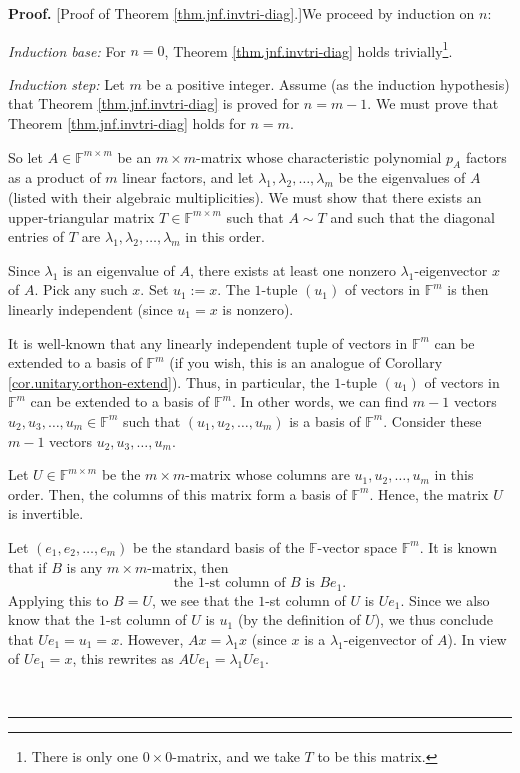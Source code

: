 \documentclass[numbers=enddot,12pt,final,onecolumn,notitlepage]{scrartcl}%
\numberwithin{exer}{subsection}
\theoremstyle{definition}
\newenvironment{proof}[1][Proof]{\noindent\textbf{#1.} }{\ \rule{0.5em}{0.5em}}
\begin{document}
\begin{proof}
[Proof of Theorem \ref{thm.jnf.invtri-diag}.]We proceed by induction on $n$:

\textit{Induction base:} For $n=0$, Theorem \ref{thm.jnf.invtri-diag} holds
trivially\footnote{There is only one $0\times0$-matrix, and we take $T$ to be
this matrix.}.

\textit{Induction step:} Let $m$ be a positive integer. Assume (as the
induction hypothesis) that Theorem \ref{thm.jnf.invtri-diag} is proved for
$n=m-1$. We must prove that Theorem \ref{thm.jnf.invtri-diag} holds for $n=m$.

So let $A\in\mathbb{F}^{m\times m}$ be an $m\times m$-matrix whose
characteristic polynomial $p_{A}$ factors as a product of $m$ linear factors,
and let $\lambda_{1},\lambda_{2},\ldots,\lambda_{m}$ be the eigenvalues of $A$
(listed with their algebraic multiplicities). We must show that there exists
an upper-triangular matrix $T\in\mathbb{F}^{m\times m}$ such that $A\sim T$
and such that the diagonal entries of $T$ are $\lambda_{1},\lambda_{2}%
,\ldots,\lambda_{m}$ in this order.

Since $\lambda_{1}$ is an eigenvalue of $A$, there exists at least one nonzero
$\lambda_{1}$-eigenvector $x$ of $A$. Pick any such $x$. Set $u_{1}:=x$. The
$1$-tuple $\left(  u_{1}\right)  $ of vectors in $\mathbb{F}^{m}$ is then
linearly independent (since $u_{1}=x$ is nonzero).

It is well-known that any linearly independent tuple of vectors in
$\mathbb{F}^{m}$ can be extended to a basis of $\mathbb{F}^{m}$ (if you wish,
this is an analogue of Corollary \ref{cor.unitary.orthon-extend}). Thus, in
particular, the $1$-tuple $\left(  u_{1}\right)  $ of vectors in
$\mathbb{F}^{m}$ can be extended to a basis of $\mathbb{F}^{m}$. In other
words, we can find $m-1$ vectors $u_{2},u_{3},\ldots,u_{m}\in\mathbb{F}^{m}$
such that $\left(  u_{1},u_{2},\ldots,u_{m}\right)  $ is a basis of
$\mathbb{F}^{m}$. Consider these $m-1$ vectors $u_{2},u_{3},\ldots,u_{m}$.

Let $U\in\mathbb{F}^{m\times m}$ be the $m\times m$-matrix whose columns are
$u_{1},u_{2},\ldots,u_{m}$ in this order. Then, the columns of this matrix
form a basis of $\mathbb{F}^{m}$. Hence, the matrix $U$ is invertible.

Let $\left(  e_{1},e_{2},\ldots,e_{m}\right)  $ be the standard basis of the
$\mathbb{F}$-vector space $\mathbb{F}^{m}$. It is known that if $B$ is any
$m\times m$-matrix, then%
\begin{equation}
\text{the }1\text{-st column of }B\text{ is }Be_{1}.
\label{pf.thm.jnf.invtri-diag.col1}%
\end{equation}
Applying this to $B=U$, we see that the $1$-st column of $U$ is $Ue_{1}$.
Since we also know that the $1$-st column of $U$ is $u_{1}$ (by the definition
of $U$), we thus conclude that $Ue_{1}=u_{1}=x$. However, $Ax=\lambda_{1}x$
(since $x$ is a $\lambda_{1}$-eigenvector of $A$). In view of $Ue_{1}=x$, this
rewrites as $AUe_{1}=\lambda_{1}Ue_{1}$.


\end{proof}
\end{document}
